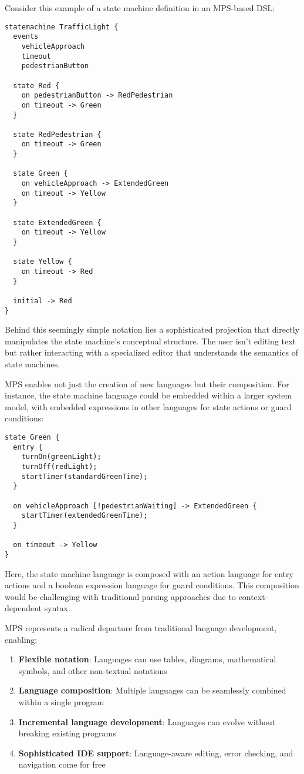 \documentclass[11pt]{article}
\begin{document}
Consider this example of a state machine definition in an MPS-based DSL:

\begin{verbatim}
statemachine TrafficLight {
  events
    vehicleApproach
    timeout
    pedestrianButton
    
  state Red {
    on pedestrianButton -> RedPedestrian
    on timeout -> Green
  }
  
  state RedPedestrian {
    on timeout -> Green
  }
  
  state Green {
    on vehicleApproach -> ExtendedGreen
    on timeout -> Yellow
  }
  
  state ExtendedGreen {
    on timeout -> Yellow
  }
  
  state Yellow {
    on timeout -> Red
  }
  
  initial -> Red
}
\end{verbatim}

Behind this seemingly simple notation lies a sophisticated projection that directly manipulates the state machine's conceptual structure. The user isn't editing text but rather interacting with a specialized editor that understands the semantics of state machines.

MPS enables not just the creation of new languages but their composition. For instance, the state machine language could be embedded within a larger system model, with embedded expressions in other languages for state actions or guard conditions:

\begin{verbatim}
state Green {
  entry {
    turnOn(greenLight);
    turnOff(redLight);
    startTimer(standardGreenTime);
  }
  
  on vehicleApproach [!pedestrianWaiting] -> ExtendedGreen {
    startTimer(extendedGreenTime);
  }
  
  on timeout -> Yellow
}
\end{verbatim}

Here, the state machine language is composed with an action language for entry actions and a boolean expression language for guard conditions. This composition would be challenging with traditional parsing approaches due to context-dependent syntax.

MPS represents a radical departure from traditional language development, enabling:

\begin{enumerate}
\item \textbf{Flexible notation}: Languages can use tables, diagrams, mathematical symbols, and other non-textual notations
\item \textbf{Language composition}: Multiple languages can be seamlessly combined within a single program
\item \textbf{Incremental language development}: Languages can evolve without breaking existing programs
\item \textbf{Sophisticated IDE support}: Language-aware editing, error checking, and navigation come for free
\end{enumerate}
\end{document}
